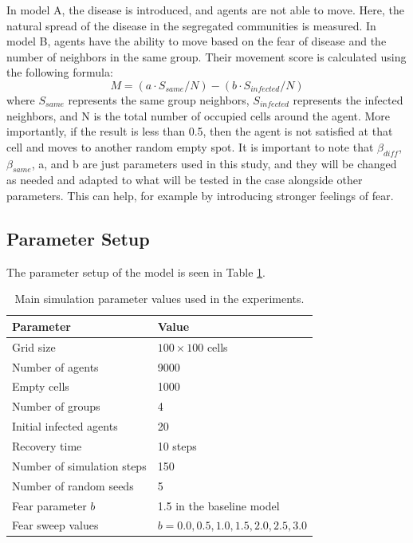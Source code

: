 \documentclass[11pt,a4paper]{article}
\begin{document}
In model A, the disease is introduced, and agents are not able to move. Here, the natural spread of the disease in the segregated communities is measured. In model B, agents have the ability to move based on the fear of disease and the number of neighbors in the same group. Their movement score is calculated using the following formula:
\[
M = (a \cdot S_{same} / N) - (b \cdot S_{infected} / N)
\]
where \(S_{same}\) represents the same group neighbors, \(S_{infected}\) represents the infected neighbors, and N is the total number of occupied cells around the agent. More importantly, if the result is less than 0.5, then the agent is not satisfied at that cell and moves to another random empty spot.
It is important to note that $\beta_{diff}$, $\beta_{same}$, a, and b are just parameters used in this study, and they will be changed as needed and adapted to what will be tested in the case alongside other parameters. This can help, for example by introducing stronger feelings of fear.


\subsection{Parameter Setup}

The parameter setup of the model is seen in Table \ref{tab:simulation-parameters}.

\begin{table}[htbp]
\centering
\caption{Main simulation parameter values used in the experiments.}
\label{tab:simulation-parameters}
\begin{tabular}{ll}
\toprule
Parameter & Value \\
\midrule
Grid size & \(100 \times 100\) cells \\
Number of agents & 9000 \\
Empty cells & 1000 \\
Number of groups & 4 \\
Initial infected agents & 20 \\
Recovery time & 10 steps \\
Number of simulation steps & 150 \\
Number of random seeds & 5 \\
Fear parameter \(b\) & 1.5 in the baseline model \\
Fear sweep values & \(b = 0.0, 0.5, 1.0, 1.5, 2.0, 2.5, 3.0\) \\
\bottomrule
\end{tabular}
\end{table}
\end{document}
